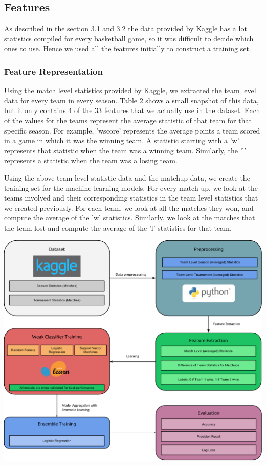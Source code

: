 \documentclass{article}
\begin{document}
\begin{multicols}{2}
	\subsection{Features}
	As described in the section 3.1 and 3.2 the data provided by Kaggle has a lot statistics compiled for every
basketball game, so it was difficult to decide which ones to use. Hence we used all the features initially to construct a training set. 
	\subsubsection{Feature Representation}
	Using the match level statistics provided by Kaggle, we extracted the team level data for every team in every season. Table 2 shows a small snapshot of this data, but it only contains 4 of the 33 features that we actually use in the dataset. Each of the values for the teams represent the average statistic of that team for that specific season. For example, 'wscore' represents the average points a team scored in a game in which it was the winning team. A statistic starting with a 'w' represents that statistic when the team was a winning team. Similarly, the 'l' represents a statistic when the team was a losing team. \linebreak
	
	Using the above team level statistic data and the matchup data, we create the training set for the machine learning models. For every match up, we look at the teams involved and their corresponding statistics in the team level statistics that we created previously.  For each team, we look at all the matches they won, and compute the average of the 'w' statistics. Similarly, we look at the matches that the team lost and compute the average of the 'l' statistics for that team. 
	\linebreak 
	
	\end{multicols}  	
	\begin{center}
	\begin{center}
	\includegraphics[width=160mm]{images/1_architecture.png}
	\end{center}
	\end{center}
\end{document}
